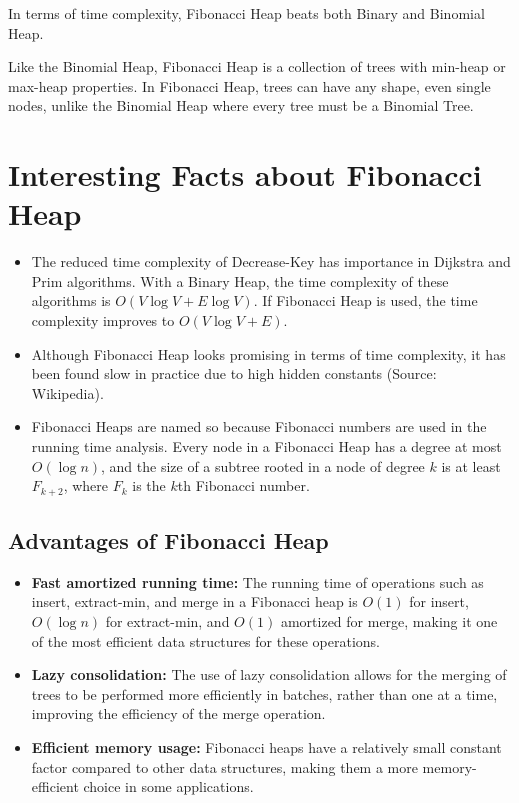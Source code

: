 \documentclass[a4paper,10pt]{article}
\begin{document}
In terms of time complexity, Fibonacci Heap beats both Binary and Binomial Heap.



Like the Binomial Heap, Fibonacci Heap is a collection of trees with min-heap or max-heap properties. In Fibonacci Heap, trees can have any shape, even single nodes, unlike the Binomial Heap where every tree must be a Binomial Tree.

\section*{Interesting Facts about Fibonacci Heap}

\begin{itemize}
    \item The reduced time complexity of Decrease-Key has importance in Dijkstra and Prim algorithms. With a Binary Heap, the time complexity of these algorithms is $O(V \log V + E \log V)$. If Fibonacci Heap is used, the time complexity improves to $O(V \log V + E)$.
    \item Although Fibonacci Heap looks promising in terms of time complexity, it has been found slow in practice due to high hidden constants (Source: Wikipedia).
    \item Fibonacci Heaps are named so because Fibonacci numbers are used in the running time analysis. Every node in a Fibonacci Heap has a degree at most $O(\log n)$, and the size of a subtree rooted in a node of degree $k$ is at least $F_{k+2}$, where $F_k$ is the $k$th Fibonacci number.
\end{itemize}

\subsection*{Advantages of Fibonacci Heap}

\begin{itemize}
    \item \textbf{Fast amortized running time:} The running time of operations such as insert, extract-min, and merge in a Fibonacci heap is $O(1)$ for insert, $O(\log n)$ for extract-min, and $O(1)$ amortized for merge, making it one of the most efficient data structures for these operations.
    \item \textbf{Lazy consolidation:} The use of lazy consolidation allows for the merging of trees to be performed more efficiently in batches, rather than one at a time, improving the efficiency of the merge operation.
    \item \textbf{Efficient memory usage:} Fibonacci heaps have a relatively small constant factor compared to other data structures, making them a more memory-efficient choice in some applications.
\end{itemize}
\end{document}
